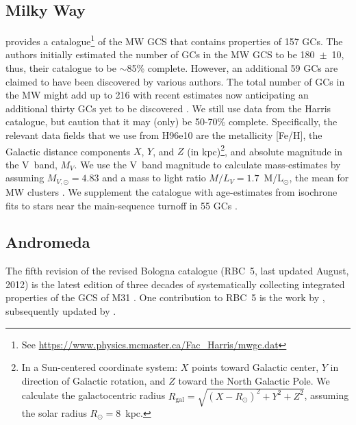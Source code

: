 \documentclass[a4paper,fleqn,usenatbib]{mnras}
\providecommand{\DIFadd}[1]{{\protect\color{blue}\uwave{#1}}} %
\providecommand{\DIFdel}[1]{{\protect\color{red}\sout{#1}}}                      %
\providecommand{\DIFaddbegin}{} %
\providecommand{\DIFaddend}{} %
\providecommand{\DIFdelbegin}{} %
\providecommand{\DIFdelend}{} %
\newcommand{\DIFscaledelfig}{0.5}
\newlength{\DIFdelgraphicswidth} %
\newlength{\DIFdelgraphicsheight} %
\newcommand{\DIFaddincludegraphics}[2][]{{\color{blue}\fbox{\DIFOincludegraphics[#1]{#2}}}} %
\newcommand{\DIFdelincludegraphics}[2][]{%
\sbox{\DIFdelgraphicsbox}{\DIFOincludegraphics[#1]{#2}}%
\settoboxwidth{\DIFdelgraphicswidth}{\DIFdelgraphicsbox} %
\settoboxtotalheight{\DIFdelgraphicsheight}{\DIFdelgraphicsbox} %
\scalebox{\DIFscaledelfig}{%
\parbox[b]{\DIFdelgraphicswidth}{\usebox{\DIFdelgraphicsbox}\\[-\baselineskip] \rule{\DIFdelgraphicswidth}{0em}}\llap{\resizebox{\DIFdelgraphicswidth}{\DIFdelgraphicsheight}{%
\setlength{\unitlength}{\DIFdelgraphicswidth}%
\begin{picture}(1,1)%
\thicklines\linethickness{2pt} %
{\color[rgb]{1,0,0}\put(0,0){\framebox(1,1){}}}%
{\color[rgb]{1,0,0}\put(0,0){\line( 1,1){1}}}%
{\color[rgb]{1,0,0}\put(0,1){\line(1,-1){1}}}%
\end{picture}%
}\hspace*{3pt}}} %
} %
\DeclareRobustCommand{\DIFaddbegin}{\DIFOaddbegin \let\includegraphics\DIFaddincludegraphics} %
\DeclareRobustCommand{\DIFaddend}{\DIFOaddend \let\includegraphics\DIFOincludegraphics} %
\DeclareRobustCommand{\DIFdelbegin}{\DIFOdelbegin \let\includegraphics\DIFdelincludegraphics} %
\DeclareRobustCommand{\DIFdelend}{\DIFOaddend \let\includegraphics\DIFOincludegraphics} %
\begin{document}
\subsection{Milky Way}
\label{sec:milkyway}
\citet[][2010 edition; hereafter H96e10]{1996AJ....112.1487H} provides a
catalogue\footnote{See \url{https://www.physics.mcmaster.ca/Fac_Harris/mwgc.dat}}
of the MW GCS that contains properties of 157 GCs. 
The authors initially estimated the number of GCs in the MW GCS to be 180~$\pm$~10,
thus, their catalogue to be ${\sim}$85\% complete. However, an additional 59 GCs
are claimed to have been discovered by various authors. The total number of GCs
in the MW might add up to 216 with recent estimates now anticipating an additional 
thirty GCs yet to be discovered \citep[e.g.][and references therein]{2018ApJ...863L..38R}.
We still use data from the Harris catalogue, but caution that it may (only) be
50-70\% complete. Specifically, the relevant data fields that we use from H96e10
are the metallicity [Fe/H], the Galactic distance components $X$, $Y$, and $Z$ (in
kpc)\footnote{In a Sun-centered coordinate system: $X$ points toward Galactic
center, $Y$ in direction of Galactic rotation, and $Z$ toward the North Galactic
Pole. We calculate the galactocentric radius \DIFdelbegin \DIFdel{$R_{\text{gal}}=\sqrt{(X-R_\odot)^2
+ Y^2 + Z^2}$}\DIFdelend \DIFaddbegin \DIFadd{$r_{\text{gal}}=\sqrt{(X-r_\odot)^2
+ Y^2 + Z^2}$}\DIFaddend , assuming the solar radius \DIFdelbegin \DIFdel{$R_\odot=8$}\DIFdelend \DIFaddbegin \DIFadd{$r_\odot=8$}\DIFaddend ~kpc.}, and absolute
magnitude in the V~band, $M_V$. We use the V~band magnitude to calculate 
mass-estimates by assuming $M_{V,\odot}=4.83$ and a mass to light ratio 
$M/L_V = 1.7$~M/L$_{\odot}$, the mean for MW clusters \citep{2005ApJS..161..304M}. 
We supplement the catalogue with age-estimates from isochrone fits to stars near 
the main-sequence turnoff in 55 GCs \citep[][hereafter V13]{2013ApJ...775..134V}.


\subsection{Andromeda}
\label{sec:andromeda}
The fifth revision of the revised Bologna catalogue (RBC~5, last updated
August, 2012) is the latest edition of three decades of systematically
collecting integrated properties of the GCS of M31 \citep[][and references therein]{2004A&A...416..917G}. One
contribution to RBC~5 is the work by \citet[][hereafter C11]{2011AJ....141...61C},
subsequently updated by \citet[][hereafter CR16]{2016ApJ...824...42C}.
\end{document}
